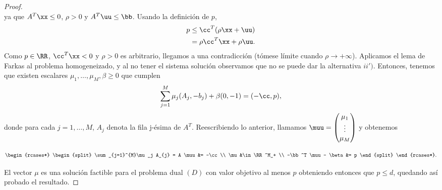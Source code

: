 \begin{proof}
\begin{equation*}
	\end{equation*}
	ya que $ A^T\xx \leq 0$, $ \rho >0 $ y $ A^T\uu \leq \bb $. Usando la definición de $ p $, 
	\begin{equation*}
	\begin{split}
	p &\leq \cc^T(\rho\xx + \uu)\\
	&=\rho\cc^T\xx + \rho\uu.
	\end{split}
	\end{equation*}
	Como $ p \in \RR $, $ \cc^T\xx < 0 $ y $ \rho >0 $ es arbitrario, llegamos a una contradicción (tómese límite cuando $ \rho \longrightarrow +\infty $). Aplicamos el lema de Farkas al problema homogeneizado, y al no tener el sistema solución observamos que no se puede dar la alternativa $ ii') $. Entonces, tenemos que existen escalares $\mu_1,\dots,\mu_M,\beta \geq 0 $ que cumplen
	\[
	\sum_{j=1}^{M}\mu_j (A_{j},-b_j) + \beta(0,-1) = (-\cc,p),
	\]
	donde para cada $ j = 1,\dots,M $, $ A_j $ denota la fila j-ésima de $ A^T $. Reescribiendo lo anterior, llamamos $ \muu = \begin{pmatrix}
	\mu_{1} \\
	\vdots \\
	\mu_{M}
	\end{pmatrix} $ y obtenemos
	
	\begin{equation*}
	\begin{rcases*}
	\begin{split} 
	\sum_{j=1}^{M}\mu_j A_{j} = A \muu &= -\cc\\
	\mu &\in \RR^M_+ \\
	-\bb^T \muu - \beta &= p
	\end{split}
	\end{rcases*}.
	\end{equation*}
	
	El vector $ \mu $ es una solución factible para el problema dual $ (D) $ con valor objetivo al menos $ p $ obteniendo entonces que $ p \leq d $, quedando así probado el resultado.
\end{proof}
\bigskip